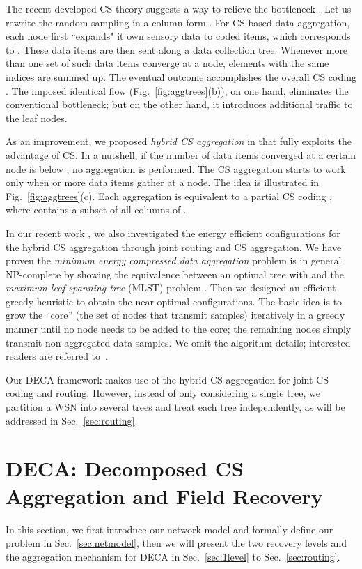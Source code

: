 \documentclass[conference]{IEEEtran}
\begin{document}
    The recent developed CS theory suggests a way to relieve the bottleneck \cite{Haupt-SPMag08, LuoWSC-MobiCom09}. Let us rewrite the random sampling in a column form . For CS-based data aggregation, each node  first ``expands" it own sensory data  to  coded items, which corresponds to . These  data items are then sent along a data collection tree. Whenever more than one set of such data items converge at a node, elements with the same indices are summed up. The eventual outcome accomplishes the overall CS coding . The imposed identical flow (Fig.~\ref{fig:aggtrees}(b)), on one hand, eliminates the conventional bottleneck; but on the other hand, it introduces additional traffic to the leaf nodes.

    As an improvement, we proposed \textit{hybrid CS aggregation} in \cite{LuoXR-ICC10} that fully exploits the advantage of CS. In a nutshell, if the number of data items converged at a certain node is below , no aggregation is performed. The CS aggregation starts to work only when  or more data items gather at a node. The idea is illustrated in Fig.~\ref{fig:aggtrees}(c). Each aggregation is equivalent to a partial CS coding , where  contains a subset of all columns of .

    In our recent work \cite{XiangLV-SECON11}, we also investigated the energy efficient configurations for the hybrid CS aggregation through joint routing and CS aggregation. We have proven the \textit{minimum energy compressed data aggregation} problem is in general NP-complete by showing the equivalence between an optimal tree with  and the \textit{maximum leaf spanning tree} (MLST) problem \cite{GareyJ79}. Then we designed an efficient greedy heuristic to obtain the near optimal configurations. The basic idea is to grow the ``core'' (the set of nodes that transmit  samples) iteratively in a greedy manner until no node needs to be added to the core; the remaining nodes simply transmit non-aggregated data samples. We omit the algorithm details; interested readers are referred to~\cite{XiangLV-SECON11}.

    Our DECA framework makes use of the hybrid CS aggregation for joint CS coding and routing. However, instead of only considering a single tree, we partition a WSN into several trees and treat each tree independently, as will be addressed in Sec.~\ref{sec:routing}.



\section{DECA: Decomposed CS Aggregation and Field Recovery} \label{sec:deca}
In this section, we first introduce our network model and formally define our problem in Sec.~\ref{sec:netmodel}, then we will present the two recovery levels and the aggregation mechanism for DECA in Sec.~\ref{sec:1level} to Sec.~\ref{sec:routing}.
\end{document}
